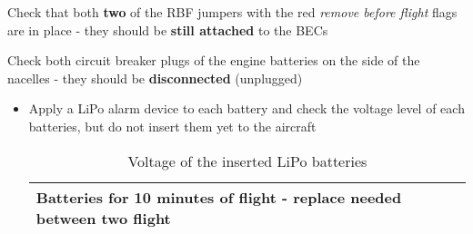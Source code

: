       \begin{todolist}
        \item Check that both \textbf{two} of the RBF jumpers with the red
          \emph{remove before flight} flags are in place - they should be
          \textbf{still attached} to the BECs
        \item Check both circuit breaker plugs of the engine batteries on the side
          of the nacelles - they should be \textbf{disconnected} (unplugged)
          
	 \end{todolist}
     \begin{itemize}
        \item Apply a LiPo alarm device to each battery and check the voltage level
          of each batteries, but do not insert them yet to the aircraft
        
        

        \begin{table}
        		\centering
        		\caption*{Voltage of the inserted LiPo batteries}
        		\renewcommand{\arraystretch}{2} %
        		\begin{tabular}{|p{1.3cm}|p{2.2cm}|p{1.2cm}|c|p{1.8cm}|p{1.8cm}|p{1cm}|p{1.8cm}|p{1.8cm}|}
        			\multicolumn{9}{l}{Batteries for 10 minutes of flight - replace needed between two flight} \\ \hline
        			

\end{tabular}
\end{table}
\end{itemize}
